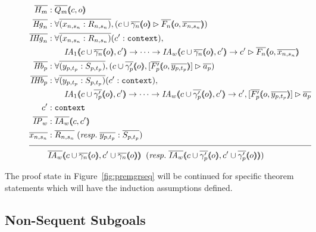 \begin{figure}
\begin{align*}
\ol{H_m} &: \ol{Q_m} \args{c , o} \\
\ol{\mathit{Hg}_n} &: \forall \ol{(x_{n,s_n} : R_{n,s_n})}, (\seqsl[c \cup \ol{\gamma_n} \args{o}]{\ol{F_n} \args{o , \ol{x_{n,s_n}}})} \\
\ol{\mathit{IHg}_n} &: \forall \ol{(x_{n,s_n} : R_{n,s_n})} (\inddyncon{} : \sltm{context}), \\
& \qquad \mathit{IA}_1 \args{c \cup \ol{\gamma_n} \args{o} , \inddyncon{}} \rightarrow \dots \rightarrow \mathit{IA}_w \args{c \cup \ol{\gamma_n} \args{o} , \inddyncon{}} \rightarrow \seqsl[\inddyncon{}]{\ol{F_n} \args{o , \ol{x_{n,s_n}}}} \\
\ol{\mathit{Hb}_p} &: \forall \ol{(y_{p,t_p} : S_{p,t_p})}, (\bchsl[c \cup \ol{\gamma'_p} \args{o}]{\ol{F'_p} \args{o , \ol{y_{p,t_p}}}}{\ol{a_p}}) \\
\ol{\mathit{IHb}_p} &: \forall \ol{(y_{p,t_p} : S_{p,t_p})} (\inddyncon{} : \sltm{context}), \\
& \qquad \mathit{IA}_1 \args{c \cup \ol{\gamma'_p} \args{o} , \inddyncon{}} \rightarrow \dots \rightarrow \mathit{IA}_w \args{c \cup \ol{\gamma'_p} \args{o} , \inddyncon{}} \rightarrow \bchsl[\inddyncon{}]{\ol{F'_p} \args{o , \ol{y_{p,t_p}}}}{\ol{a_p}} \\
\inddyncon{} &: \sltm{context} \\
\ol{\mathit{IP}_w} &: \ol{\mathit{IA}_w} \args{c , \inddyncon{}} \\
\ol{x_{n,s_n}} &: \ol{R_{n,s_n}} \; (\mathit{resp.} \; \ol{y_{p,t_p}} : \ol{S_{p,t_p}}) \\[\pfshift{}]
\cline{1-2}
& \ol{\mathit{IA}_w} \args{c \cup \ol{\gamma_n} \args{o} , \inddyncon{} \cup \ol{\gamma_n} \args{o}} \;\; (\mathit{resp.} \; \ol{\mathit{IA}_w} \args{c \cup \ol{\gamma'_p} \args{o} , \inddyncon{} \cup \ol{\gamma'_p} \args{o}})
\end{align*}
\end{figure}

The proof state in Figure~\ref{fig:premgrseq} will be continued for specific theorem statements which will have the induction assumptions defined.

\subsection{Non-Sequent Subgoals}
\label{subsec:subpfnonseq}

